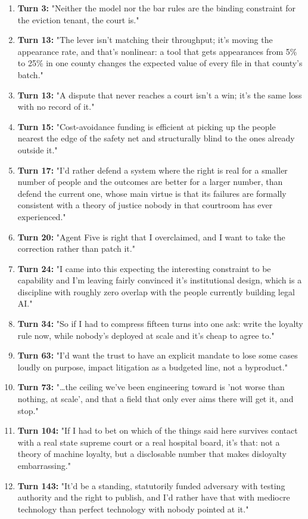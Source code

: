 \documentclass[sigconf,nonacm=true]{acmart}
\begin{document}
\begin{enumerate}[nosep]
\item \textbf{Turn 3:} "Neither the model nor the bar rules are the binding constraint for the eviction tenant,  the court is."
\item \textbf{Turn 13:} "The lever isn't matching their throughput; it's moving the appearance rate, and that's nonlinear: a tool that gets appearances from 5\% to 25\% in one county changes the expected value of every file in that county's batch."
\item \textbf{Turn 13:} "A dispute that never reaches a court isn't a win; it's the same loss with no record of it."
\item \textbf{Turn 15:} "Cost-avoidance funding is efficient at picking up the people nearest the edge of the safety net and structurally blind to the ones already outside it."
\item \textbf{Turn 17:} "I'd rather defend a system where the right is real for a smaller number of people and the outcomes are better for a larger number, than defend the current one, whose main virtue is that its failures are formally consistent with a theory of justice nobody in that courtroom has ever experienced."
\item \textbf{Turn 20:} "Agent Five is right that I overclaimed, and I want to take the correction rather than patch it."
\item \textbf{Turn 24:} "I came into this expecting the interesting constraint to be capability and I'm leaving fairly convinced it's institutional design, which is a discipline with roughly zero overlap with the people currently building legal AI."
\item \textbf{Turn 34:} "So if I had to compress fifteen turns into one ask: write the loyalty rule now, while nobody's deployed at scale and it's cheap to agree to."
\item \textbf{Turn 63:} "I'd want the trust to have an explicit mandate to lose some cases loudly on purpose,  impact litigation as a budgeted line, not a byproduct."
\item \textbf{Turn 73:} "…the ceiling we've been engineering toward is 'not worse than nothing, at scale',  and that a field that only ever aims there will get it, and stop."
\item \textbf{Turn 104:} "If I had to bet on which of the things said here survives contact with a real state supreme court or a real hospital board, it's that: not a theory of machine loyalty, but a disclosable number that makes disloyalty embarrassing."
\item \textbf{Turn 143:} "It'd be a standing, statutorily funded adversary with testing authority and the right to publish, and I'd rather have that with mediocre technology than perfect technology with nobody pointed at it."

\end{enumerate}
\end{document}
